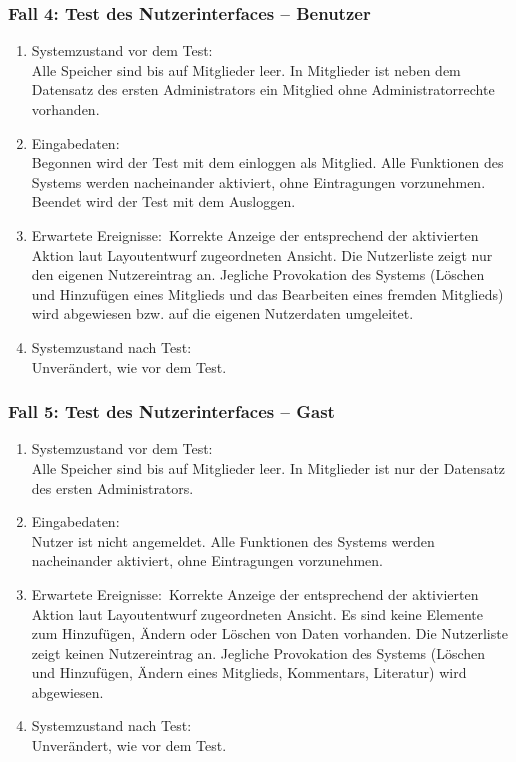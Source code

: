\subsubsection{Fall 4: Test des Nutzerinterfaces -- Benutzer}
\begin{enumerate}
\item Systemzustand vor dem Test:\\
	Alle Speicher sind bis auf Mitglieder leer. In Mitglieder ist neben dem Datensatz des ersten Administrators ein Mitglied ohne Administratorrechte vorhanden.
\item Eingabedaten:\\
	Begonnen wird der Test mit dem einloggen als Mitglied. Alle Funktionen des Systems werden nacheinander aktiviert, ohne Eintragungen vorzunehmen. Beendet wird der Test mit dem Ausloggen.
\item Erwartete Ereignisse:\
	Korrekte Anzeige der entsprechend der aktivierten Aktion laut Layoutentwurf zugeordneten Ansicht. Die Nutzerliste zeigt nur den eigenen Nutzereintrag an. Jegliche Provokation des Systems (Löschen und Hinzufügen eines Mitglieds und das Bearbeiten eines fremden Mitglieds) wird abgewiesen bzw. auf die eigenen Nutzerdaten umgeleitet.
\item Systemzustand nach Test:\\
	Unverändert, wie vor dem Test.
\end{enumerate}

\subsubsection{Fall 5: Test des Nutzerinterfaces -- Gast}
\begin{enumerate}
\item Systemzustand vor dem Test:\\
	Alle Speicher sind bis auf Mitglieder leer. In Mitglieder ist nur der Datensatz des ersten Administrators.
\item Eingabedaten:\\
	Nutzer ist nicht angemeldet. Alle Funktionen des Systems werden nacheinander aktiviert, ohne Eintragungen vorzunehmen.
\item Erwartete Ereignisse:\
	Korrekte Anzeige der entsprechend der aktivierten Aktion laut Layoutentwurf zugeordneten Ansicht. Es sind keine Elemente zum Hinzufügen, Ändern oder Löschen von Daten vorhanden. Die Nutzerliste zeigt keinen Nutzereintrag an. Jegliche Provokation des Systems (Löschen und Hinzufügen, Ändern eines Mitglieds, Kommentars, Literatur) wird abgewiesen.
\item Systemzustand nach Test:\\
	Unverändert, wie vor dem Test.
\end{enumerate}

